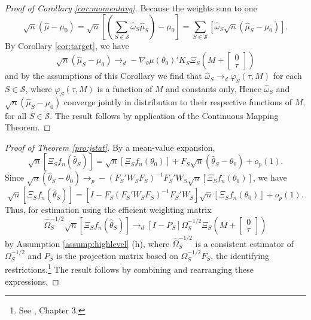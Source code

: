 \documentclass[12pt]{article}
\theoremstyle{definition}
\begin{document}
\begin{proof}[Proof of Corollary \ref{cor:momentavg}]
Because the weights sum to one
		$$\sqrt{n}\left(\widehat{\mu} - \mu_0\right) = \sqrt{n} \left[\left(\sum_{S \in \mathscr{S}} \widehat{\omega}_S \widehat{\mu}_S\right) - \mu_0\right]= \sum_{S \in \mathscr{S}}\left[ \widehat{\omega}_S \sqrt{n}\left(\widehat{\mu}_S - \mu_0\right)\right].$$
By Corollary \ref{cor:target}, we have
$$\sqrt{n}\left(\widehat{\mu}_S - \mu_0\right)\rightarrow_d-\nabla_\theta\mu(\theta_0)'K_S \Xi_S \left(M +  \left[\begin{array}
	{c} 0 \\ \tau
\end{array} \right]\right)$$
and by the assumptions of this Corollary we find that $\widehat{\omega}_S \rightarrow_d\varphi_S(\tau,M)$ for each $S\in \mathscr{S}$, where $\varphi_S(\tau,M)$ is a function of $M$ and constants only. 
Hence $\widehat{\omega}_S$ and $\sqrt{n}\left(\widehat{\mu}_S - \mu_0\right)$ converge jointly in distribution to their respective functions of $M$, for all $S \in \mathscr{S}$. 
The result follows by application of the Continuous Mapping Theorem.
\end{proof}

\begin{proof}[Proof of Theorem \ref{pro:jstat}]
By a mean-value expansion,
	$$\sqrt{n}\left[\Xi_S f_n\left(\widehat{\theta}_S\right)\right]  = \sqrt{n}\left[\Xi_S f_n(\theta_0)\right] + F_S  \sqrt{n}\left(\widehat{\theta}_S - \theta_0\right) + o_p(1).$$
Since $\sqrt{n}\left(\widehat{\theta}_S - \theta_0\right) \rightarrow_p -\left(F_S' W_S F_S  \right)^{-1}F_S'W_S\sqrt{n}\left[\Xi_S f_n(\theta_0)\right]$, we have
	$$\sqrt{n}\left[\Xi_S f_n(\widehat{\theta}_S)\right] = \left[I - F_S\left(F_S' W_S F_S  \right)^{-1}F_S'W_S\right] \sqrt{n}\left[\Xi_S f_n(\theta_0)\right] + o_p(1).$$
Thus, for estimation using the efficient weighting matrix 
$$\widehat{\Omega}^{-1/2}_S \sqrt{n}\left[\Xi_S f_n\left(\widehat{\theta}_S\right)\right] \rightarrow_d\left[I - P_S\right] \Omega_S^{-1/2}\Xi_S\left(M + \left[\begin{array}{c}0\\ \tau \end{array} \right] \right)$$
by Assumption \ref{assump:highlevel} (h), where $\widehat{\Omega}^{-1/2}_S$ is a consistent estimator of $\Omega_S^{-1/2}$ and $P_S$ is the projection matrix based on $\Omega^{-1/2}_S F_S$, the identifying restrictions.\footnote{See \cite{Hallbook}, Chapter 3.} The result follows by combining and rearranging these expressions.
\end{proof}
\end{document}
